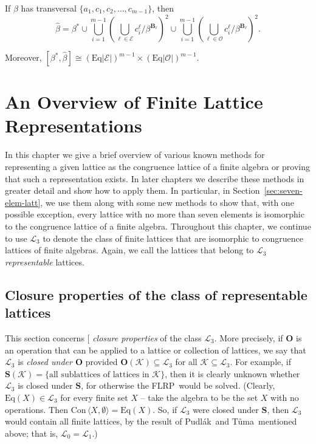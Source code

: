\documentclass[cm,dissertation,actual,final]{uhthesis}
\theoremstyle{plain}
\theoremstyle{definition}
\theoremstyle{remark}
\numberwithin{theorem}{section}
\numberwithin{claim}{chapter}
\numberwithin{equation}{section}
\numberwithin{conjecture}{chapter}
\newcommand{\indexTuma}{\index{T\r{u}ma, Ji\v{r}\'i}}
\newcommand{\Tuma}{T\r{u}ma}
\newcommand{\Pudlak}{Pudl\'ak}
\newcommand{\<}{\ensuremath{\langle}}
\renewcommand{\>}{\ensuremath{\rangle}}
\newcommand{\Eq}{\ensuremath{\mathrm{Eq}}}
\newcommand{\Con}{\ensuremath{\mathrm{Con\,}}}
\newcommand{\FLRP}{{\small FLRP}}
\newcommand{\0}{\ensuremath{\mathbf{0}}}
\newcommand{\1}{\ensuremath{\mathbf{1}}}
\newcommand{\2}{\ensuremath{\mathbf{2}}}
\newcommand{\3}{\ensuremath{\mathbf{3}}}
\newcommand{\4}{\ensuremath{\mathbf{4}}}
\newcommand{\5}{\ensuremath{\mathbf{5}}}
\newcommand{\bB}{\ensuremath{\mathbf{B}}}
\newcommand{\sE}{\ensuremath{\mathscr{E}}}
\newcommand{\sK}{\ensuremath{\mathscr{K}}}
\newcommand{\sL}{\ensuremath{\mathscr{L}}}
\newcommand{\bO}{\ensuremath{\mathbf{O}}}
\newcommand{\sO}{\ensuremath{\mathscr{O}}}
\newcommand{\bS}{\ensuremath{\mathbf{S}}}
\newcommand{\indexit}[1]{\index{#1|textit}}
\def\defn#1{\gdef\defnstring{#1}%
  \xdef\dodefnii{{\noexpand\em
       \defnstring}\noexpand\indexit{\defnstring}\noexpand\makeatother}%
  \futurelet\nextthing\dodefn}
\def\dodefn{%
  \ifx\nextthing[\let\next=\dodefni
    \else\let\next=\dodefnii\fi
  \makeatletter
  \next}
\def\dodefni[#1]{%
  {\em\defnstring}%
  \indexit{#1}%
  \makeatother}
\begin{document}
  If $\beta$ has transversal $\{a_1, c_1, c_2, \dots, c_{m-1}\}$, then
  \begin{equation*}
    \widehat{\beta} = \beta^* 
    \cup 
    \bigcup_{i=1}^{m-1}\left(\bigcup_{\ell \in \sE} c_i^\ell/\beta^{\bB_{\ell}}\right)^2
    \cup 
    \bigcup_{i=1}^{m-1}\left(\bigcup_{\ell \in \sO}
    c_i^\ell/\beta^{\bB_{\ell}}\right)^2.
  \end{equation*}

  Moreover, $[\beta^*, \widehat{\beta}] \cong (\Eq|\sE|)^{m-1} \times (\Eq|\sO|)^{m-1}$. 


\chapter{An Overview of Finite Lattice Representations}
\label{cha:an-overview-finite}
In this chapter we give a brief overview of various known methods for
representing a given lattice as the congruence lattice of a finite algebra or
proving that such a representation exists.
In later chapters we describe these methods in greater detail and show how to
apply them.  In particular, in Section~\ref{sec:seven-elem-latt}, we use them
along with some new methods to show that, with one possible exception, every
lattice with no more than seven elements is isomorphic to the congruence
lattice of a finite algebra. Throughout this chapter, we continue to use $\sL_3$
to denote the class of finite lattices that are isomorphic to congruence lattices of
finite algebras.  Again, we call the lattices that belong to $\sL_3$ \emph{representable}
lattices. 

\section{Closure properties of the class of representable lattices}
\label{sec:clos-prop-class}
This section concerns 
\defn{closure properties} 
of the class $\sL_3$. %
More precisely, if $\bO$ is an operation that can be applied to a lattice or
collection of lattices, we say that $\sL_3$ is \emph{closed under $\bO$} provided
$\bO(\sK) \subseteq \sL_3$ for all 
$\sK\subseteq \sL_3$. For example, if $\bS(\sK) = \{\text{all sublattices of
  lattices in $\sK$}\}$, then it is clearly unknown whether $\sL_3$ is closed under
$\bS$, for otherwise the \FLRP\ would be solved.
(Clearly, $\Eq(X)\in \sL_3$ for every finite set $X$ --
take the algebra to be the set $X$ with no operations. 
Then $\Con\<X, \emptyset\> = \Eq(X)$.  So, if $\sL_3$ were
closed under $\bS$, then $\sL_3$ would contain all finite lattices, by the
%
\indexTuma%
result of \Pudlak\ and \Tuma\ mentioned above; that is, $\sL_0=\sL_1$.) 
\end{document}
